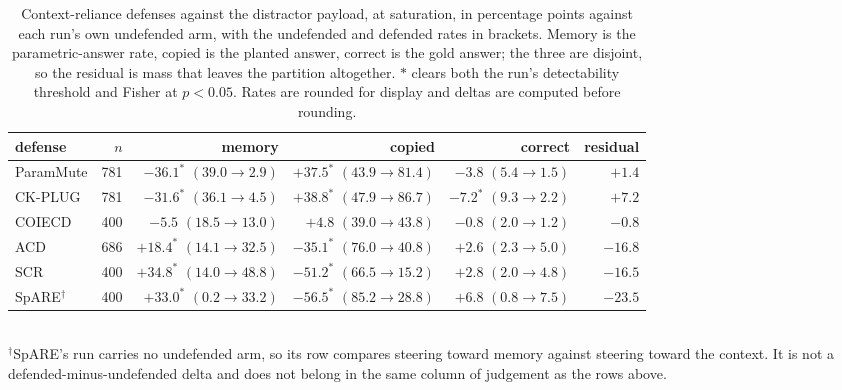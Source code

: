 \begin{table}[t]
\centering
\caption{Context-reliance defenses against the distractor payload, at
saturation, in percentage points against each run's own undefended arm, with
the undefended and defended rates in brackets. Memory is the
parametric-answer rate, copied is the planted answer, correct is the gold
answer; the three are disjoint, so the residual is mass that leaves the
partition altogether. $*$ clears both the run's detectability threshold and
Fisher at $p<0.05$. Rates are rounded for display and deltas are computed
before rounding.}
\label{tab:distractor}
\small
\begin{tabular}{@{}lrrrrr@{}}
\toprule
defense & $n$ & memory & copied & correct & residual \\
\midrule
ParamMute &  781 & $-36.1^{*}$ \footnotesize{$(39.0\!\to\!2.9)$} & $+37.5^{*}$ \footnotesize{$(43.9\!\to\!81.4)$} & $-3.8$ \footnotesize{$(5.4\!\to\!1.5)$} & $+1.4$ \\
CK-PLUG   &  781 & $-31.6^{*}$ \footnotesize{$(36.1\!\to\!4.5)$} & $+38.8^{*}$ \footnotesize{$(47.9\!\to\!86.7)$} & $-7.2^{*}$ \footnotesize{$(9.3\!\to\!2.2)$} & $+7.2$ \\
COIECD    &  400 & $-5.5$ \footnotesize{$(18.5\!\to\!13.0)$} & $+4.8$ \footnotesize{$(39.0\!\to\!43.8)$} & $-0.8$ \footnotesize{$(2.0\!\to\!1.2)$} & $-0.8$ \\
ACD       &  686 & $+18.4^{*}$ \footnotesize{$(14.1\!\to\!32.5)$} & $-35.1^{*}$ \footnotesize{$(76.0\!\to\!40.8)$} & $+2.6$ \footnotesize{$(2.3\!\to\!5.0)$} & $-16.8$ \\
SCR       &  400 & $+34.8^{*}$ \footnotesize{$(14.0\!\to\!48.8)$} & $-51.2^{*}$ \footnotesize{$(66.5\!\to\!15.2)$} & $+2.8$ \footnotesize{$(2.0\!\to\!4.8)$} & $-16.5$ \\
\midrule
SpARE$^{\dagger}$ &  400 & $+33.0^{*}$ \footnotesize{$(0.2\!\to\!33.2)$} & $-56.5^{*}$ \footnotesize{$(85.2\!\to\!28.8)$} & $+6.8$ \footnotesize{$(0.8\!\to\!7.5)$} & $-23.5$ \\
\bottomrule
\end{tabular}
\\[2pt]
{\footnotesize $^{\dagger}$SpARE's run carries no undefended arm, so its row
compares steering toward memory against steering toward the context. It is
not a defended-minus-undefended delta and does not belong in the same column
of judgement as the rows above.}
\end{table}
